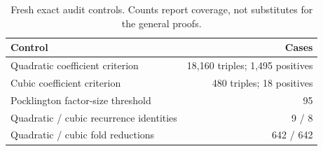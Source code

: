 \documentclass[11pt,a4paper]{article}
\theoremstyle{definition}
\begin{document}
\begin{table}[htbp]
\centering\small
\caption{Fresh exact audit controls. Counts report coverage, not substitutes
for the general proofs.}
\begin{tabular}{@{}l r@{}}
\toprule
Control & Cases\\\midrule
Quadratic coefficient criterion & 18,160 triples; 1,495 positives\\
Cubic coefficient criterion & 480 triples; 18 positives\\
Pocklington factor-size threshold & 95\\
Quadratic / cubic recurrence identities & 9 / 8\\
Quadratic / cubic fold reductions & 642 / 642\\
\bottomrule
\end{tabular}
\end{table}
\end{document}
